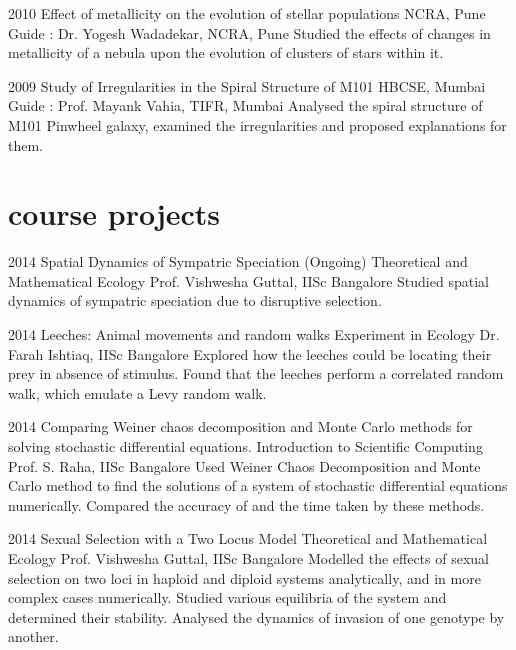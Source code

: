 \documentclass[11pt]{friggeri-cv}
\begin{document}
    \begin{entrylist}
  \entry
    {2010}
    {Effect of metallicity on the evolution of stellar populations}
    {NCRA, Pune}
    {
    Guide : Dr. Yogesh Wadadekar, NCRA, Pune}
    {Studied the effects of changes in metallicity of a nebula upon the evolution of clusters of stars within it. 
    }

    \end{entrylist}
\begin{entrylist}
  \entry
    {2009}
    {Study of Irregularities in the Spiral Structure of M101}
    {HBCSE, Mumbai}
    {
    Guide : Prof. Mayank Vahia, TIFR, Mumbai}
    {Analysed the spiral structure of M101 Pinwheel galaxy, examined the irregularities  and proposed explanations for them. 
    }    
\end{entrylist}

\section{course projects}


\begin{entrylist}
\entry
    {2014}
    {Spatial Dynamics of Sympatric Speciation (Ongoing)}
    {Theoretical and Mathematical Ecology}
    {
    Prof. Vishwesha Guttal, IISc Bangalore}
    {Studied spatial dynamics of sympatric speciation due to disruptive selection. 
    }    
\end{entrylist}



\begin{entrylist}
\entry
    {2014}
    {Leeches:
Animal movements and random walks}
    {Experiment in Ecology}
    {
    Dr. Farah Ishtiaq, IISc Bangalore}
    {Explored how the leeches could be locating their prey in absence of stimulus. Found that the leeches perform a correlated random walk, which emulate a Levy random walk.
    }    
\end{entrylist}

\begin{entrylist}
  \entry
    {2014}
    {Comparing Weiner chaos decomposition and Monte Carlo methods for solving stochastic differential equations.}
    {Introduction to Scientific Computing}
    {
    Prof. S. Raha, IISc Bangalore}
    {Used Weiner Chaos Decomposition and Monte Carlo method to find the solutions of a system of stochastic differential equations numerically. Compared the accuracy  of and the time taken by these methods. 
    }    
\end{entrylist}
\begin{entrylist}
\entry
    {2014}
    {Sexual Selection with a Two Locus Model}
    {Theoretical and Mathematical Ecology}
    {
    Prof. Vishwesha Guttal, IISc Bangalore}
    {Modelled the effects of sexual selection on two loci in haploid and diploid systems analytically, and in more complex cases numerically. Studied various equilibria of the system and determined their stability. Analysed the dynamics of invasion of one genotype by another. 
    }    
\end{entrylist}
\end{document}
